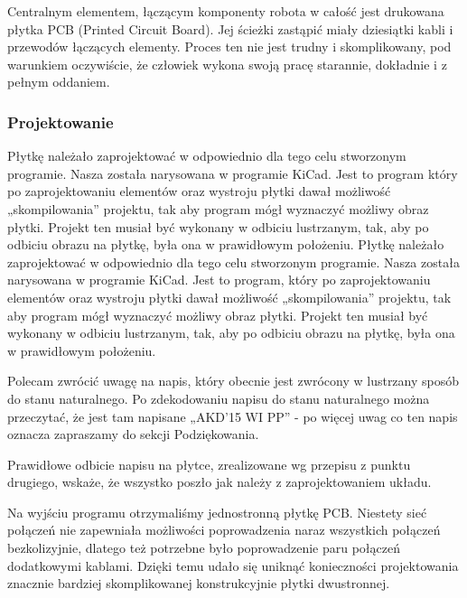 Centralnym elementem, łączącym komponenty robota w całość jest drukowana płytka PCB (Printed Circuit Board). Jej ścieżki zastąpić miały dziesiątki kabli i przewodów łączących elementy. Proces ten nie jest trudny i skomplikowany, pod warunkiem oczywiście, że człowiek wykona swoją pracę starannie, dokładnie i z pełnym oddaniem.

\subsubsection{Projektowanie}

Płytkę należało zaprojektować w odpowiednio dla tego celu stworzonym programie. Nasza została narysowana w programie KiCad. Jest to program który po zaprojektowaniu elementów oraz wystroju płytki dawał możliwość „skompilowania” projektu, tak aby program mógł wyznaczyć możliwy obraz płytki. Projekt ten musiał być wykonany w odbiciu lustrzanym, tak, aby po odbiciu obrazu na płytkę, była ona w prawidłowym położeniu.
Płytkę należało zaprojektować w odpowiednio dla tego celu stworzonym programie. Nasza została narysowana w programie KiCad. Jest to program, który po zaprojektowaniu elementów oraz wystroju płytki dawał możliwość „skompilowania” projektu, tak aby program mógł wyznaczyć możliwy obraz płytki. Projekt ten musiał być wykonany w odbiciu lustrzanym, tak, aby po odbiciu obrazu na płytkę, była ona w prawidłowym położeniu.

Polecam zwrócić uwagę na napis, który obecnie jest zwrócony w lustrzany sposób do stanu naturalnego. Po zdekodowaniu napisu do stanu naturalnego można przeczytać, że jest tam napisane „AKD’15 WI PP” - po więcej uwag co ten napis oznacza zapraszamy do sekcji Podziękowania. 

Prawidłowe odbicie napisu na płytce, zrealizowane wg przepisu z punktu drugiego, wskaże, że wszystko poszło jak należy z zaprojektowaniem układu. 

Na wyjściu programu otrzymaliśmy jednostronną płytkę PCB. Niestety sieć połączeń nie zapewniała możliwości poprowadzenia naraz wszystkich połączeń bezkolizyjnie, dlatego też potrzebne było poprowadzenie paru połączeń dodatkowymi kablami. Dzięki temu udało się uniknąć konieczności projektowania znacznie bardziej skomplikowanej konstrukcyjnie płytki dwustronnej. 

